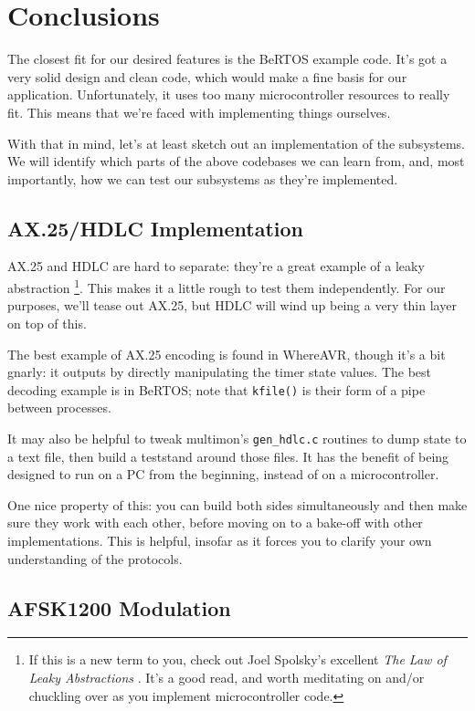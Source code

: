 \section{Conclusions}

The closest fit for our desired features is the BeRTOS example code.
It's got a very solid design and clean code, which would make a fine
basis for our application.  Unfortunately, it uses too many
microcontroller resources to really fit.  This means that we're faced
with implementing things ourselves.

With that in mind, let's at least sketch out an implementation of the
subsystems.  We will identify which parts of the above codebases we
can learn from, and, most importantly, how we can test our subsystems
as they're implemented.

\subsection{AX.25/HDLC Implementation}

AX.25 and HDLC are hard to separate: they're a great example of a
leaky abstraction \footnote{If this is a new term to you, check out
  Joel Spolsky's excellent \textit{The Law of Leaky Abstractions}
  \cite{LeakyAbstractions}.  It's a good read, and worth meditating on
  and/or chuckling over as you implement microcontroller code.}.  This
makes it a little rough to test them independently.  For our purposes,
we'll tease out AX.25, but HDLC will wind up being a very thin layer
on top of this.

The best example of AX.25 encoding is found in WhereAVR, though it's a
bit gnarly: it outputs by directly manipulating the timer state
values.  The best decoding example is in BeRTOS; note that
\texttt{kfile()} is their form of a pipe between processes.

It may also be helpful to tweak multimon's \texttt{gen\_hdlc.c}
routines to dump state to a text file, then build a teststand around
those files.  It has the benefit of being designed to run on a PC from
the beginning, instead of on a microcontroller.

One nice property of this: you can build both sides simultaneously and
then make sure they work with each other, before moving on to a
bake-off with other implementations.  This is helpful, insofar as it
forces you to clarify your own understanding of the protocols.


\subsection{AFSK1200 Modulation}


